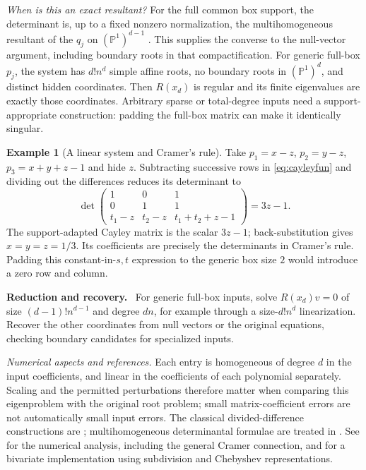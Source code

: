 \documentclass[12pt]{article}
\theoremstyle{definition}
\newtheorem{example}[theorem]{Example}
\theoremstyle{remark}
\newenvironment{reduction}
  {\par\medskip\noindent\textbf{Reduction and recovery.}\ }
  {\par\medskip}
\begin{document}
\emph{When is this an exact resultant?} For the full common box support,
the determinant is, up to a fixed nonzero normalization, the
multihomogeneous resultant of the $q_j$ on $(\mathbb P^1)^{d-1}$
\cite[Thm.~6.13]{dickenstein2003multihomogeneous}. This supplies the converse
to the null-vector argument, including boundary roots in that compactification.
For generic full-box $p_j$, the system has $d!n^d$ simple affine roots,
no boundary roots in $(\mathbb P^1)^d$, and distinct hidden coordinates.
Then $R(x_d)$ is regular
and its finite eigenvalues are exactly those coordinates.
Arbitrary sparse or total-degree inputs need a support-appropriate
construction: padding the full-box matrix can make it identically singular.

\begin{example}[A linear system and Cramer's rule]
  Take $p_1=x-z$, $p_2=y-z$, $p_3=x+y+z-1$ and hide $z$.
  Subtracting successive rows in \eqref{eq:cayleyfun} and dividing out the
  differences reduces its determinant to
  \[
    \det\begin{pmatrix}1&0&1\\0&1&1\\t_1-z&t_2-z&t_1+t_2+z-1\end{pmatrix}
    =3z-1.
  \]
  The support-adapted Cayley matrix is the scalar $3z-1$; back-substitution
  gives $x=y=z=1/3$. Its coefficients are precisely the determinants in
  Cramer's rule. Padding this constant-in-$s,t$ expression to the generic
  box size $2$ would introduce a zero row and column.
\end{example}

\begin{reduction}
  For generic full-box inputs, solve $R(x_d)v=0$ of size
  $(d-1)!n^{d-1}$ and degree $dn$, for example through a size-$d!n^d$
  linearization. Recover the other coordinates from null vectors or the
  original equations, checking boundary candidates for specialized inputs.
\end{reduction}

\emph{Numerical aspects and references.} Each entry is homogeneous of degree
$d$ in the input coefficients, and linear in the coefficients of each
polynomial separately. Scaling and the permitted perturbations therefore
matter when comparing this eigenproblem with the original root problem;
small matrix-coefficient errors are not automatically small input errors.
The classical divided-difference constructions are
\cite{cayley1857note,dixon1909eliminant}; multihomogeneous determinantal
formulae are treated in \cite{dickenstein2003multihomogeneous}.
See \cite{noferini2016numerical} for the numerical analysis, including the
general Cramer connection, and \cite{nakatsukasa2015computing} for a
bivariate implementation using subdivision and Chebyshev representations.
\end{document}
